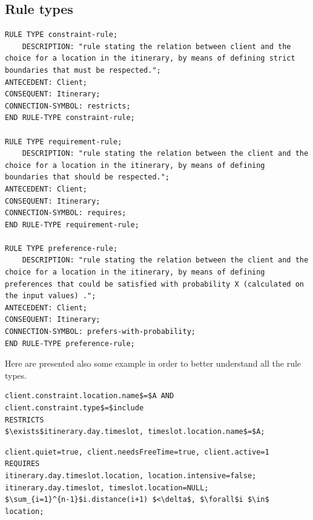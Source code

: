 \documentclass[11pt]{article} %
\begin{document}

\subsection{Rule types}

\begin{lstlisting}[label=Rules,caption=Rules,breaklines=true]
RULE TYPE constraint-rule;
    DESCRIPTION: "rule stating the relation between client and the choice for a location in the itinerary, by means of defining strict boundaries that must be respected.";
ANTECEDENT: Client;
CONSEQUENT: Itinerary;
CONNECTION-SYMBOL: restricts;
END RULE-TYPE constraint-rule;

RULE TYPE requirement-rule;
    DESCRIPTION: "rule stating the relation between the client and the choice for a location in the itinerary, by means of defining boundaries that should be respected.";
ANTECEDENT: Client;
CONSEQUENT: Itinerary;
CONNECTION-SYMBOL: requires;
END RULE-TYPE requirement-rule;

RULE TYPE preference-rule;
    DESCRIPTION: "rule stating the relation between the client and the choice for a location in the itinerary, by means of defining preferences that could be satisfied with probability X (calculated on the input values) .";
ANTECEDENT: Client;
CONSEQUENT: Itinerary;
CONNECTION-SYMBOL: prefers-with-probability;
END RULE-TYPE preference-rule;
\end{lstlisting}


\noindent
Here are presented also some example in order to better understand all the rule types.

\begin{lstlisting}[label=Rules,caption=The client wants to include a destination into the itinerary.,breaklines=true,mathescape=true]
client.constraint.location.name$=$A AND client.constraint.type$=$include
RESTRICTS
$\exists$itinerary.day.timeslot, timeslot.location.name$=$A;
\end{lstlisting}



\begin{lstlisting}[label=Rules,caption=The client is a quite person,breaklines=true,mathescape=true]
client.quiet=true, client.needsFreeTime=true, client.active=1
REQUIRES
itinerary.day.timeslot.location, location.intensive=false;
itinerary.day.timeslot, timeslot.location=NULL;
$\sum_{i=1}^{n-1}$i.distance(i+1) $<\delta$, $\forall$i $\in$ location;
\end{lstlisting}
\end{document}
